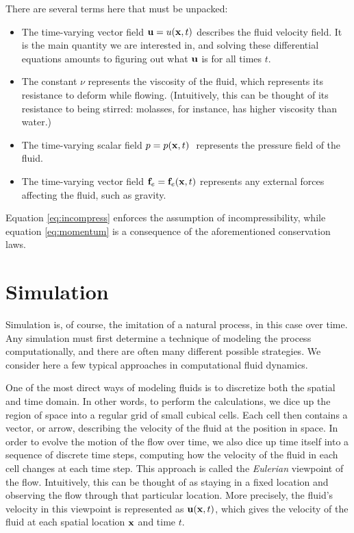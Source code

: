 There are several terms here that must be unpacked:

\begin{itemize}
\item The time-varying vector field $\mathbf{u} = u(\mathbf{x}, t)$ describes the fluid velocity field. It is the main quantity we are interested in, and solving these differential equations amounts to figuring out what $\mathbf{u}$ is for all times $t$.
\item The constant $\nu$ represents the viscosity of the fluid, which represents its resistance to deform while flowing. (Intuitively, this can be thought of its resistance to being stirred: molasses, for instance, has higher viscosity than water.) 
\item The time-varying scalar field $p = p(\mathbf{x}, t)\ $ represents the pressure field of the fluid. 
\item The time-varying vector field $\mathbf{f}_e = \mathbf{f}_e(\mathbf{x}, t)$ represents any external forces affecting the fluid, such as gravity.
\end{itemize}
Equation \ref{eq:incompress} enforces the assumption of incompressibility, while equation \ref{eq:momentum} is a consequence of the aforementioned conservation laws.

\section{Simulation}

Simulation is, of course, the imitation of a natural process, in this case over time. Any simulation must first determine a technique of modeling the process computationally, and there are often many different possible strategies. We consider here a few typical approaches in computational fluid dynamics.

One of the most direct ways of modeling fluids is to discretize both the spatial and time domain. In other words, to perform the calculations, we dice up the region of space into a regular grid of small cubical cells. Each cell then contains a vector, or arrow, describing the velocity of the fluid at the position in space. In order to evolve the motion of the flow over time, we also dice up time itself into a sequence of discrete time steps, computing how the velocity of the fluid in each cell changes at each time step. This approach is called the {\em Eulerian} viewpoint of the flow. Intuitively, this can be thought of as staying in a fixed location and observing the flow through that particular location. More precisely, the fluid's velocity in this viewpoint is represented as $\mathbf{u}(\mathbf{x}, t)$, which gives the velocity of the fluid at each spatial location $\mathbf{x}$ and time $t$.

